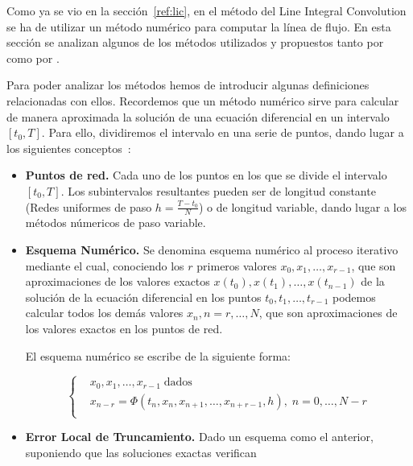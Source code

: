 Como ya se vio en la sección~\ref{ref:lic}, en el método del Line Integral
Convolution se ha de utilizar un método numérico para computar la línea de
flujo. En esta sección se analizan algunos de los métodos utilizados y
propuestos tanto por~\citet{osti_10185520} como por \citet{licthesis}.

Para poder analizar los métodos hemos de introducir algunas definiciones
relacionadas con ellos. Recordemos que un método numérico sirve para calcular de
manera aproximada la solución de una ecuación diferencial en un intervalo $[t_0,
T]$. Para ello, dividiremos el intervalo en una serie de puntos, dando lugar a
los siguientes conceptos~\cite{ANNU}:

\begin{itemize}

		\item \textbf{Puntos de red.} Cada uno de los puntos en los que se
				divide el intervalo $[t_0, T]$. Los subintervalos resultantes
				pueden ser de longitud constante (Redes uniformes de paso
				$h=\frac{T-t_0}{N}$) o de longitud variable, dando lugar a
				los métodos númericos de paso variable.

		\item \textbf{Esquema Numérico.} Se denomina esquema numérico al proceso
				iterativo mediante el cual, conociendo los $r$ primeros valores
				$x_0, x_1, \ldots, x_{r-1}$, que son aproximaciones de los
				valores exactos $x(t_0),x(t_1),\ldots,x(t_{n-1})$ de la solución
				de la ecuación diferencial en los puntos $t_0, t_1, \ldots,
				t_{r-1}$ podemos calcular todos los demás valores $x_n, n =
				r,\ldots,N$, que son aproximaciones de los valores exactos en
				los puntos de red.

				El esquema numérico se escribe de la siguiente forma:

				\begin{equation}
					\left\{ \begin{aligned}
							& x_0,x_1,\ldots,x_{r-1} \; \textrm{dados} \\
							& x_{n-r} = \Phi
							(t_n,x_n,x_{n+1},\ldots,x_{n+r-1},h), \; n =
							0,\ldots,N-r \\
					\end{aligned} \right.
				\end{equation}

		\item \textbf{Error Local de Truncamiento.} Dado un esquema como el
				anterior, suponiendo que las soluciones exactas verifican


\end{itemize}

